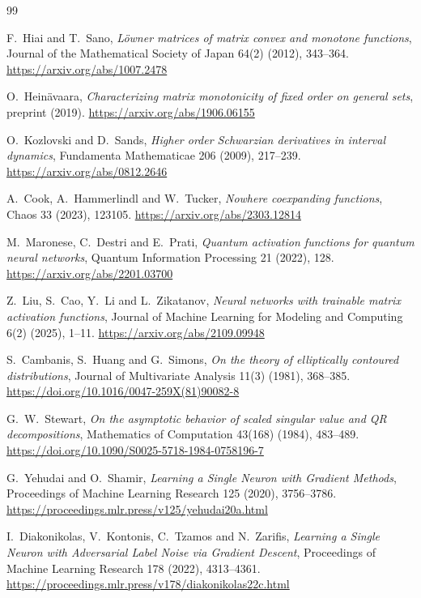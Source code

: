 \documentclass[11pt]{article}
\begin{document}
\begin{thebibliography}{99}
\let\oldbibitem\bibitem
\renewcommand{\bibitem}{\par\oldbibitem}
\setlength{\itemsep}{1pt}
\small
{}
F.~Hiai and T.~Sano,
\emph{L\"owner matrices of matrix convex and monotone functions},
Journal of the Mathematical Society of Japan 64(2) (2012), 343--364.
\url{https://arxiv.org/abs/1007.2478}

O.~Hein\"avaara,
\emph{Characterizing matrix monotonicity of fixed order on general sets},
preprint (2019).
\url{https://arxiv.org/abs/1906.06155}

O.~Kozlovski and D.~Sands,
\emph{Higher order Schwarzian derivatives in interval dynamics},
Fundamenta Mathematicae 206 (2009), 217--239.
\url{https://arxiv.org/abs/0812.2646}

A.~Cook, A.~Hammerlindl and W.~Tucker,
\emph{Nowhere coexpanding functions},
Chaos 33 (2023), 123105.
\url{https://arxiv.org/abs/2303.12814}

M.~Maronese, C.~Destri and E.~Prati,
\emph{Quantum activation functions for quantum neural networks},
Quantum Information Processing 21 (2022), 128.
\url{https://arxiv.org/abs/2201.03700}

Z.~Liu, S.~Cao, Y.~Li and L.~Zikatanov,
\emph{Neural networks with trainable matrix activation functions},
Journal of Machine Learning for Modeling and Computing 6(2) (2025), 1--11.
\url{https://arxiv.org/abs/2109.09948}

S.~Cambanis, S.~Huang and G.~Simons,
\emph{On the theory of elliptically contoured distributions},
Journal of Multivariate Analysis 11(3) (1981), 368--385.
\url{https://doi.org/10.1016/0047-259X(81)90082-8}

G.~W.~Stewart,
\emph{On the asymptotic behavior of scaled singular value and QR decompositions},
Mathematics of Computation 43(168) (1984), 483--489.
\url{https://doi.org/10.1090/S0025-5718-1984-0758196-7}

G.~Yehudai and O.~Shamir,
\emph{Learning a Single Neuron with Gradient Methods},
Proceedings of Machine Learning Research 125 (2020), 3756--3786.
\url{https://proceedings.mlr.press/v125/yehudai20a.html}

I.~Diakonikolas, V.~Kontonis, C.~Tzamos and N.~Zarifis,
\emph{Learning a Single Neuron with Adversarial Label Noise via Gradient Descent},
Proceedings of Machine Learning Research 178 (2022), 4313--4361.
\url{https://proceedings.mlr.press/v178/diakonikolas22c.html}


\end{thebibliography}
\end{document}
